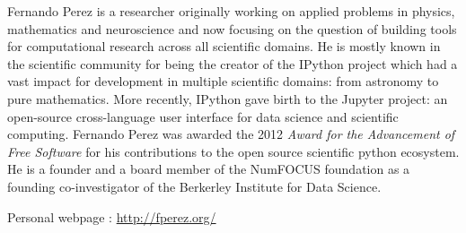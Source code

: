 \documentclass{paper}
\begin{document}
Fernando Perez is a researcher originally working on applied problems in physics, 
mathematics and neuroscience and now focusing on the question of building tools 
for computational research across all scientific domains. He is mostly known
in the scientific community for being the creator of the IPython project which
had a vast impact for development in multiple scientific domains: from astronomy
to pure mathematics. More recently, IPython gave birth to the Jupyter project: an 
open-source cross-language user interface for data science and scientific computing. 
Fernando Perez was awarded the 2012 \textit{Award for the Advancement of Free Software} for
his contributions to the open source scientific python ecosystem. He is a founder and  a board 
member of the NumFOCUS foundation as a founding co-investigator of the Berkerley Institute
for Data Science.

\medskip

Personal webpage : \url{http://fperez.org/}
\end{document}
